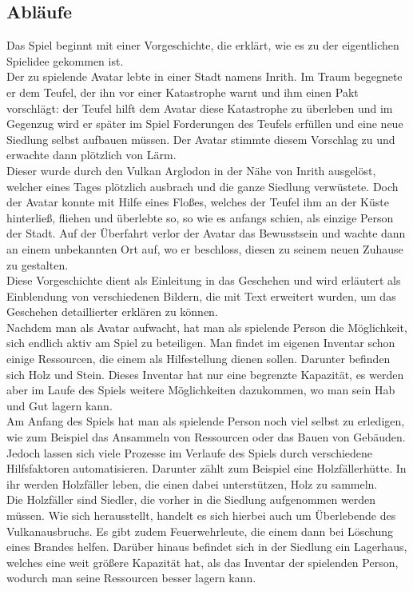 \documentclass[paper=A4,pagesize=auto,12pt,headinclude=true,footinclude=true,BCOR=0mm,DIV=calc]{scrartcl}
\newcommand{\sectionspace}{
	\vspace{0.5cm}
}
\begin{document}
\sectionspace
\subsection{Abläufe}\label{sec:Ablaeufe}
Das Spiel beginnt mit einer Vorgeschichte, die erklärt, wie es zu der eigentlichen Spielidee gekommen ist. \\
Der zu spielende Avatar lebte in einer Stadt namens Inrith. Im Traum begegnete er dem Teufel, der ihn vor einer Katastrophe warnt und ihm einen Pakt vorschlägt: der Teufel hilft dem Avatar diese Katastrophe zu überleben und im Gegenzug wird er später im Spiel Forderungen des Teufels erfüllen und eine neue Siedlung selbst aufbauen müssen. Der Avatar stimmte diesem Vorschlag zu und erwachte dann plötzlich von Lärm. \\
Dieser wurde durch den Vulkan Arglodon in der Nähe von Inrith ausgelöst, welcher eines Tages plötzlich ausbrach und die ganze Siedlung verwüstete. Doch der Avatar konnte mit Hilfe eines Floßes, welches der Teufel ihm an der Küste hinterließ, fliehen und überlebte so, so wie es anfangs schien, als einzige Person der Stadt. Auf der Überfahrt verlor der Avatar das Bewusstsein und wachte dann an einem unbekannten Ort auf, wo er beschloss, diesen zu seinem neuen Zuhause zu gestalten. \\
Diese Vorgeschichte dient als Einleitung in das Geschehen und wird erläutert als Einblendung von verschiedenen Bildern, die mit Text erweitert wurden, um das Geschehen detaillierter erklären zu können. \\
Nachdem man als Avatar aufwacht, hat man als spielende Person die Möglichkeit, sich endlich aktiv am Spiel zu beteiligen. Man findet im eigenen Inventar schon einige Ressourcen, die einem als Hilfestellung dienen sollen. Darunter befinden sich Holz und Stein. Dieses Inventar hat nur eine begrenzte Kapazität, es werden aber im Laufe des Spiels weitere Möglichkeiten dazukommen, wo man sein Hab und Gut lagern kann.\\
Am Anfang des Spiels hat man als spielende Person noch viel selbst zu erledigen, wie zum Beispiel das Ansammeln von Ressourcen oder das Bauen von Gebäuden. Jedoch lassen sich viele Prozesse im Verlaufe des Spiels durch verschiedene Hilfsfaktoren automatisieren. Darunter zählt zum Beispiel eine Holzfällerhütte. In ihr werden Holzfäller leben, die einen dabei unterstützen, Holz zu sammeln. \\
Die Holzfäller sind Siedler, die vorher in die Siedlung aufgenommen werden müssen. Wie sich herausstellt, handelt es sich hierbei auch um Überlebende des Vulkanausbruchs. Es gibt zudem Feuerwehrleute, die einem dann bei Löschung eines Brandes helfen. Darüber hinaus befindet sich in der Siedlung ein Lagerhaus, welches eine weit größere Kapazität hat, als das Inventar der spielenden Person, wodurch man seine Ressourcen besser lagern kann. \\
\end{document}
